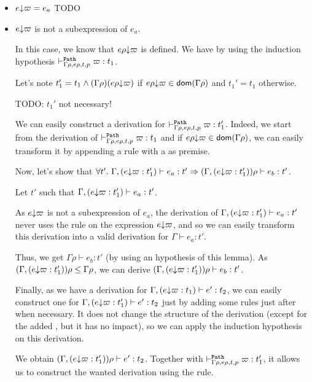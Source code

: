 \documentclass[a4paper]{article}
\theoremstyle{definition}
\begin{document}
\begin{description}
\begin{itemize}
            \item $\occ e \varpi = e_a$ TODO

            \item $\occ e \varpi$ is not a subexpression of $e_a$.
            
            In this case, we know that $\occ {e\rho} \varpi$ is defined. We have by using the induction hypothesis $\pvdash {\Gamma\rho} p {e\rho} t \varpi:t_1$.

            Let's note $t_1' = t_1\land (\Gamma\rho)(\occ {e\rho} \varpi)$ if $\occ {e\rho} \varpi \in\dom {\Gamma\rho}$ and $t_1' = t_1$ otherwise.
            
            TODO: $t_1'$ not necessary!

            We can easily construct a derivation for $\pvdash {\Gamma\rho} p {e\rho} t \varpi:t_1'$.
            Indeed, we start from the derivation of $\pvdash {\Gamma\rho} p {e\rho} t \varpi:t_1$ and if $\occ {e\rho} \varpi \in\dom {\Gamma\rho}$,
            we can easily transform it by appending a rule  with a  as premise.

            Now, let's show that $\forall t'.\ \Gamma,(\occ e \varpi:t_1') \vdash e_a : t' \Rightarrow (\Gamma,(\occ e \varpi:t_1'))\rho \vdash e_b:t'$.
            
            Let $t'$ such that $\Gamma,(\occ e \varpi:t_1') \vdash e_a : t'$.

            As $\occ e \varpi$ is not a subexpression of $e_a$, the derivation of
            $\Gamma,(\occ e \varpi:t_1') \vdash e_a : t'$ never uses the rule  on the expression $\occ e \varpi$,
            and so we can easily transform this derivation into a valid derivation for $\Gamma \vdash e_a : t'$.
 
            Thus, we get $\Gamma\rho \vdash e_b : t'$ (by using an hypothesis of this lemma).
            As $(\Gamma,(\occ e \varpi:t_1'))\rho \leq \Gamma\rho$,
            we can derive $(\Gamma,(\occ e \varpi:t_1'))\rho\vdash e_b : t'$.

            Finally, as we have a derivation for $\Gamma,(\occ e \varpi:t_1) \vdash e' : t_2$, we can easily construct one for
            $\Gamma,(\occ e \varpi:t_1') \vdash e' : t_2$ just by adding some rules  just after  when necessary.
            It does not change the structure of the derivation (except for the added , but it has no impact),
            so we can apply the induction hypothesis on this derivation.

            We obtain $(\Gamma,(\occ e \varpi:t_1'))\rho \vdash e' : t_2$.
            Together with $\pvdash {\Gamma\rho} p {e\rho} t \varpi:t_1'$, it allows us to construct the wanted derivation using the
             rule.
          \end{itemize} 
        \end{description}
\end{document}
